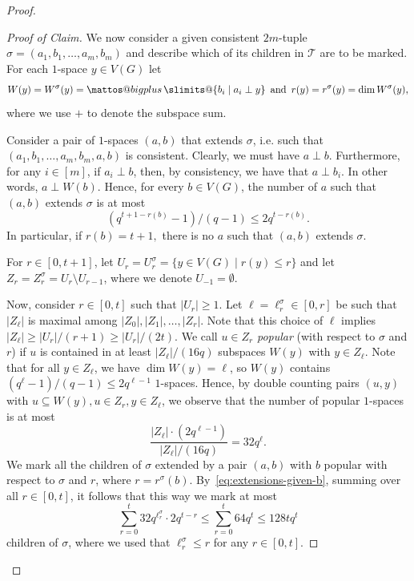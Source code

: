 \documentclass{article}
\makeatletter
\theoremstyle{plain}
\theoremstyle{definition}
\newcommand{\cT}{\mathcal{T}}
\newcommand{\bigplus}{%
  \DOTSB\mathop{\mathpalette\mattos@bigplus\relax}\slimits@
}
\newcommand\mattos@bigplus[2]{%
  \vcenter{\hbox{%
    \sbox\z@{$#1\sum$}%
    \resizebox{!}{0.9\dimexpr\ht\z@+\dp\z@}{\raisebox{\depth}{$\m@th#1+$}}%
  }}%
  \vphantom{\sum}%
}
\makeatother
\begin{document}
\begin{proof}
\begin{proof}[Proof of Claim]
        We now consider a given consistent $2m$-tuple $\sigma = (a_1, b_1, \dots, a_m, b_m)$ and describe which of its children in $\cT$ are to be marked. For each $1$-space $y \in V(G)$ let
        \[  W(y) = W^\sigma(y) = \bigplus\{ b_i \mid a_i \perp y \} \, \text{ and }  \, r(y) = r^\sigma(y) = \dim W^\sigma(y), \]
        where we use $+$ to denote the subspace sum.

        Consider a pair of $1$-spaces $(a, b)$ that extends $\sigma$, i.e. such that $(a_1, b_1, \dots, a_m, b_m, a, b)$ is consistent. Clearly, we must have $a \perp b$. Furthermore, for any $i \in [m]$, if $a_i \perp b$, then, by consistency, we have that $a \perp b_i$. In other words, $a \perp W(b)$. Hence, for every $b \in V(G)$, the number of $a$ such that $(a, b)$ extends $\sigma$ is at most
        \begin{equation} \label{eq:extensions-given-b}
         (q^{t+1-r(b)} - 1) / (q-1) \le 2q^{t - r(b)}.
        \end{equation}
        In particular, if $r(b) = t+1,$ there is no $a$ such that $(a, b)$ extends $\sigma$.

        For $r \in [0, t+1]$, let $U_r = U_r^\sigma = \{ y \in V(G) \mid r(y) \le r \}$ and let $Z_r = Z_r^\sigma = U_r \setminus U_{r-1}$, where we denote $U_{-1} = \emptyset$. 
        
        Now, consider $r \in [0, t]$ such that $|U_r| \ge 1$. Let $\ell = \ell_r^{\sigma} \in [0, r]$ be such that $|Z_\ell|$ is maximal among $|Z_0|, |Z_1|, \dots, |Z_r|$. Note that this choice of $\ell$ implies $|Z_{\ell}| \ge |U_r| / (r+1) \ge |U_r| / (2t).$ We call $u \in Z_r$ \emph{popular} (with respect to $\sigma$ and $r$) if $u$ is contained in at least $|Z_\ell| / (16q)$ subspaces $W(y)$ with $y \in Z_\ell$. Note that for all $y \in Z_\ell$, we have $\dim W(y) = \ell$, so $W(y)$ contains $(q^{\ell} - 1) / (q-1) \le 2q^{\ell-1}$ $1$-spaces. Hence, by double counting pairs $(u, y)$ with $u \subseteq W(y), u \in Z_r, y \in Z_\ell$, we observe that the number of popular $1$-spaces is at most 
        \[ \frac{|Z_\ell| \cdot (2q^{\ell-1})}{|Z_\ell| / (16q)} = 32 q^{\ell}. \]
        We mark all the children of $\sigma$ extended by a pair $(a, b)$ with $b$ popular with respect to $\sigma$ and $r$, where $r = r^\sigma(b)$. By~\eqref{eq:extensions-given-b}, summing over all $r \in [0, t]$, it follows that this way we mark at most
        \[ \sum_{r=0}^t 32q^{\ell^\sigma_r} \cdot 2q^{t - r} \le \sum_{r=0}^t 64 q^t \le 128t q^t \]
        children of $\sigma$, where we used that $\ell_r^\sigma \le r$ for any $r \in [0, t]$.


\end{proof}
\end{proof}
\end{document}

